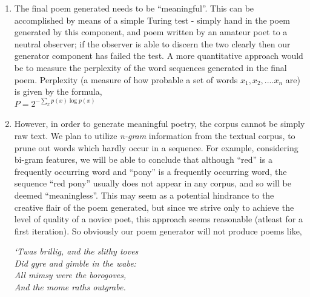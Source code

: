 \documentclass[10pt, letter,twocolumn]{IEEEtran}
\begin{document}
\begin{enumerate}
	\item The final poem generated needs to be ``meaningful''. This can be accomplished by means of a simple Turing test - simply hand in the poem generated by this component, and poem written by an amateur poet to a neutral observer; if the observer is able to discern the two clearly then our generator component has failed the test. A more quantitative approach would be to measure the perplexity of the word sequences generated in the final poem. Perplexity (a measure of how probable a set of words $x_1, x_2, ....x_n$ are) is given by the formula, \\ 
	$P = 2^{-\sum_x p(x) \log p(x) }$
	\item However, in order to generate meaningful poetry, the corpus cannot be simply raw text. We plan to utilize \textit{n-gram} information from the textual corpus, to prune out words which hardly occur in a sequence. For example, considering bi-gram features, we will be able to conclude that although ``red'' is a frequently occurring word and ``pony'' is a frequently occurring word, the sequence ``red pony'' usually does not appear in any corpus, and so will be deemed ``meaningless''. This may seem as a potential hindrance to the creative flair of the poem generated, but since we strive only to achieve the level of quality of a novice poet, this approach seems reasonable (atleast for a first iteration). So obviously our poem generator will not produce poems like, \\
\begin{center}
	\textit{`Twas brillig, and the slithy toves\\
  	Did gyre and gimble in the wabe:\\
	All mimsy were the borogoves,\\
  	And the mome raths outgrabe.\\}
\end{center}	
\end{enumerate}
\end{document}
